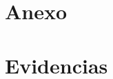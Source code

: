 \documentclass[10pt,a4paper]{article}
\begin{document}
\pagebreak
\section*{Anexo}
\appendix
\section{Evidencias}
\label{ann:evidencias}

\end{document}
